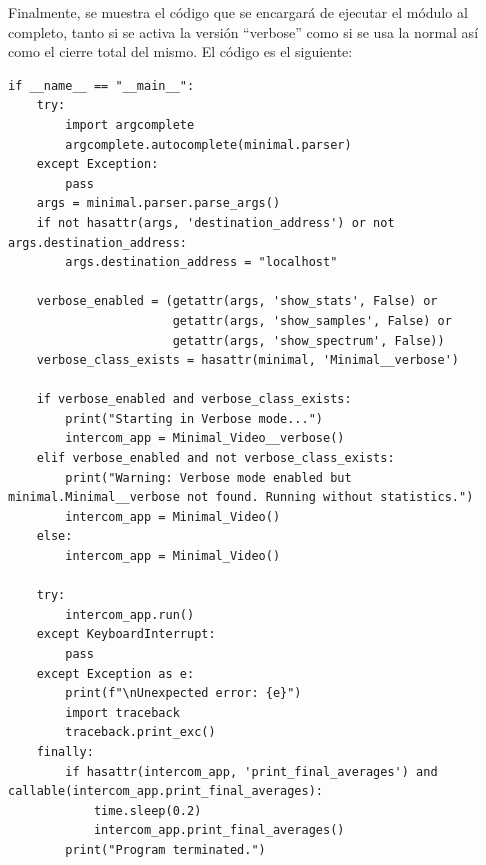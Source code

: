 Finalmente, se muestra el código que se encargará de ejecutar el módulo al completo, tanto si se activa la versión ``verbose'' como si se usa la normal así como el cierre total del mismo. El código es el siguiente:
\begin{lstlisting}[style=pythonstyle, caption={Bloque de ejecución del \texttt{main()} de \textit{Minimal\_Video}.}, label={lst:main_minimal_video}]
if __name__ == "__main__":
    try:
        import argcomplete
        argcomplete.autocomplete(minimal.parser)
    except Exception:
        pass
    args = minimal.parser.parse_args()
    if not hasattr(args, 'destination_address') or not args.destination_address:
        args.destination_address = "localhost"

    verbose_enabled = (getattr(args, 'show_stats', False) or
                       getattr(args, 'show_samples', False) or
                       getattr(args, 'show_spectrum', False))
    verbose_class_exists = hasattr(minimal, 'Minimal__verbose')

    if verbose_enabled and verbose_class_exists:
        print("Starting in Verbose mode...")
        intercom_app = Minimal_Video__verbose()
    elif verbose_enabled and not verbose_class_exists:
        print("Warning: Verbose mode enabled but minimal.Minimal__verbose not found. Running without statistics.")
        intercom_app = Minimal_Video()
    else:
        intercom_app = Minimal_Video()

    try:
        intercom_app.run()
    except KeyboardInterrupt:
        pass
    except Exception as e:
        print(f"\nUnexpected error: {e}")
        import traceback
        traceback.print_exc()
    finally:
        if hasattr(intercom_app, 'print_final_averages') and callable(intercom_app.print_final_averages):
            time.sleep(0.2)
            intercom_app.print_final_averages()
        print("Program terminated.")
\end{lstlisting}
\vspace{\baselineskip}

